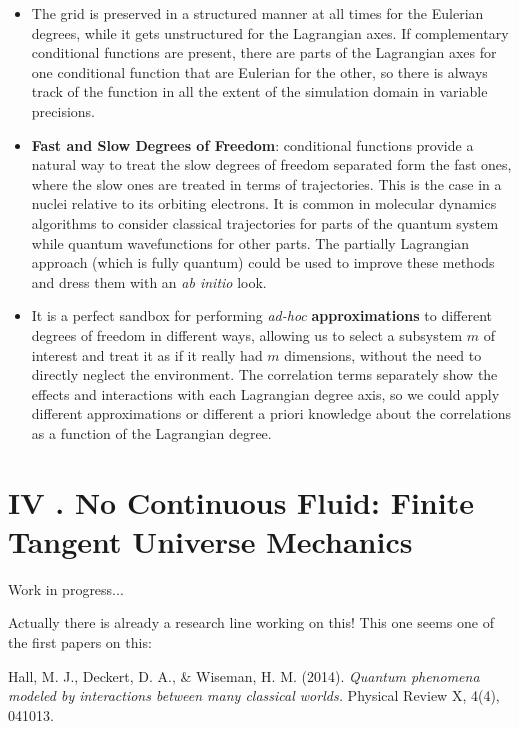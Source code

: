 \documentclass[11pt, a4paper]{article} %
\begin{document}
\begin{itemize}
\item The grid is preserved in a structured manner at all times for the Eulerian degrees, while it gets unstructured for the Lagrangian axes. If complementary conditional functions are present, there are parts of the Lagrangian axes for one conditional function that are Eulerian for the other, so there is always track of the function in all the extent of the simulation domain in variable precisions.
\item {\bf Fast and Slow Degrees of Freedom}: conditional functions provide a natural way to treat the slow degrees of freedom separated form the fast ones, where the slow ones are treated in terms of trajectories. This is the case in a nuclei relative to its orbiting electrons. It is common in molecular dynamics algorithms to consider classical trajectories for parts of the quantum system while quantum wavefunctions for other parts. The partially Lagrangian approach (which is fully quantum) could be used to improve these methods and dress them with an {\em ab initio} look.
\item It is a perfect sandbox for performing {\em ad-hoc} {\bf approximations} to different degrees of freedom in different ways, allowing us to select a subsystem $m$ of interest and treat it as if it really had $m$ dimensions, without the need to directly neglect the environment. The correlation terms separately show the effects and interactions with each Lagrangian degree axis, so we could apply different approximations or different a priori knowledge about the correlations as a function of the Lagrangian degree.
\end{itemize}




\newpage
\section*{IV . No Continuous Fluid: Finite Tangent Universe Mechanics}

Work in progress...

Actually there is already a research line working on this! This one seems one of the first papers on this:

Hall, M. J., Deckert, D. A., \& Wiseman, H. M. (2014). {\em Quantum phenomena modeled by interactions between many classical worlds.} Physical Review X, 4(4), 041013.
\end{document}
